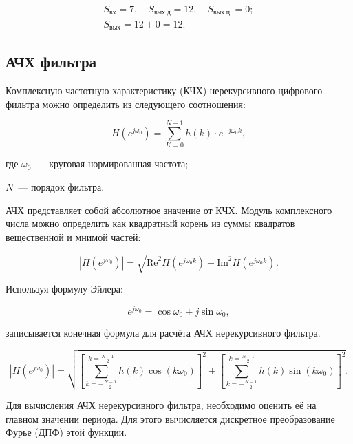 \begin{gather*}
  S_{\text{вх}} = 7, \quad
  S_{\text{вых.д}} = 12,\quad
  S_{\text{вых.ц.}} = 0;\\
  S_{\text{вых}} = 12 + 0 = 12.
\end{gather*}

\subsection{АЧХ фильтра}

Комплексную частотную характеристику (КЧХ) нерекурсивного цифрового
фильтра можно определить из следующего соотношения:

\begin{equation*}
  H(e^{j\omega_0}) = \sum_{K=0}^{N-1}h(k) \cdot e^{-j\omega_0k},
\end{equation*}

\begin{ESKDexplanation}
\item[где ] $\omega_0$~--- круговая нормированная частота;
\item $N$~--- порядок фильтра.
\end{ESKDexplanation}

АЧХ представляет собой абсолютное значение от КЧХ. Модуль комплексного
числа можно определить как квадратный корень из суммы квадратов
вещественной и мнимой частей:

\begin{equation*}
\left|H(e^{j\omega_0}) \right| = \sqrt{\text{Re}^2H(e^{j\omega_0k}) + \text{Im}^2H(e^{j\omega_0k})}.
\end{equation*}

Используя формулу Эйлера:

\begin{equation*}
  e^{j\omega_0} = \cos\omega_0 + j \sin\omega_0,
\end{equation*}

записывается конечная формула для расчёта АЧХ нерекурсивного фильтра.

\begin{equation*}
   \left|H(e^{j\omega_0})\right| = \sqrt{\left[\sum_{k =
        -\frac{N-1}{2}}^{k =
        \frac{N-1}{2}}h(k)\cos(k\omega_0)\right]^2 + \left[\sum_{k =
        -\frac{N-1}{2}}^{k =
        \frac{N-1}{2}}h(k)\sin(k\omega_0)\right]^2}.
\end{equation*}

Для вычисления АЧХ нерекурсивного фильтра, необходимо оценить её на
главном значении периода. Для этого вычисляется дискретное
преобразование Фурье (ДПФ) этой функции.

